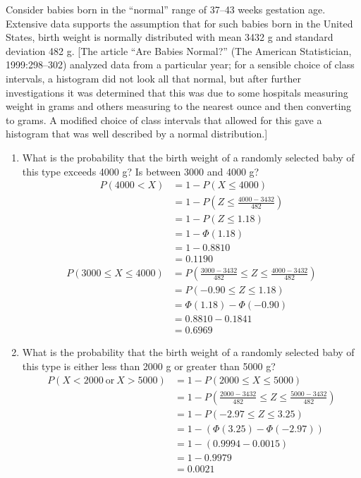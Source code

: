 \documentclass[letterpaper,12pt,fleqn]{article}
\renewcommand{\O}{\Phi}
\begin{document}
Consider babies born in the ``normal'' range of 37--43 weeks gestation age.  Extensive data supports the assumption that for
such babies born in the United States, birth weight is normally distributed with mean 3432 g and standard deviation 482 g.
[The article ``Are Babies Normal?'' (The American Statistician, 1999:298--302) analyzed data from a particular year; for a
  sensible choice of class intervals, a histogram did not look all that normal, but after further investigations it was
  determined that this was due to some hospitals measuring weight in grams and others measuring to the nearest ounce and
  then converting to grams.  A modified choice of class intervals that allowed for this gave a histogram that was well
  described by a normal distribution.]
\begin{enumerate}[label={\alph*)}]
\item What is the probability that the birth weight of a randomly selected baby of this type exceeds 4000 g? Is between
  3000 and 4000 g?
  \begin{align*}
    P(4000<X) &= 1-P(X\le4000) \\
    &= 1-P\left(Z\le\frac{4000-3432}{482}\right) \\
    &= 1-P(Z\le1.18) \\
    &= 1-\O(1.18) \\
    &= 1-0.8810 \\
    &= 0.1190
  \end{align*}
  \begin{align*}
    P(3000\le X\le4000) &= P\left(\frac{3000-3432}{482}\le Z\le\frac{4000-3432}{482}\right) \\
    &= P(-0.90\le Z\le1.18) \\
    &= \O(1.18)-\O(-0.90) \\
    &= 0.8810-0.1841 \\
    &= 0.6969
  \end{align*}
\item What is the probability that the birth weight of a randomly selected baby of this type is either less than 2000 g or
  greater than 5000 g?
  \begin{align*}
    P(X<2000\ \text{or}\ X>5000) &= 1-P(2000\le X\le5000) \\
    &= 1-P\left(\frac{2000-3432}{482}\le Z\le\frac{5000-3432}{482}\right) \\
    &= 1-P(-2.97\le Z\le3.25) \\
    &= 1-(\O(3.25)-\O(-2.97)) \\
    &= 1-(0.9994-0.0015) \\
    &= 1-0.9979 \\
    &= 0.0021
  \end{align*}


\end{enumerate}
\end{document}
